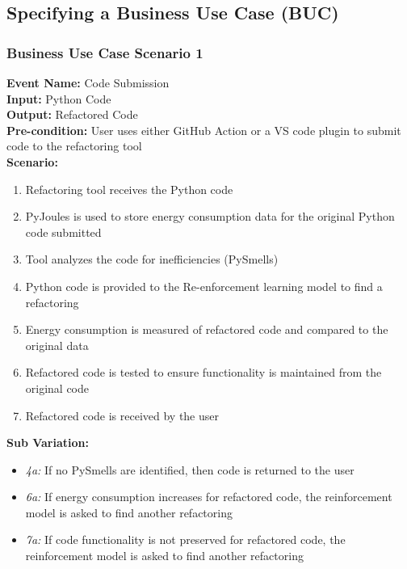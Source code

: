 \documentclass[12pt]{article}
\begin{document}
\subsection{Specifying a Business Use Case (BUC)}

\subsubsection{Business Use Case Scenario 1}
\textbf{Event Name:} Code Submission \\
\textbf{Input:} Python Code \\
\textbf{Output:} Refactored Code \\
\textbf{Pre-condition:} User uses either GitHub Action or a VS code plugin to submit code to the refactoring tool \\  
\textbf{Scenario:}
    \begin{enumerate}
        \item Refactoring tool receives the Python code
        \item PyJoules is used to store energy consumption data for the original Python code submitted
        \item Tool analyzes the code for inefficiencies (PySmells)
        \item Python code is provided to the Re-enforcement learning model to find a refactoring
        \item Energy consumption is measured of refactored code and compared to the original data
        \item Refactored code is tested to ensure functionality is maintained from the original code
        \item Refactored code is received by the user
    \end{enumerate}
\textbf{Sub Variation: }
    \begin{itemize}
        \item \textit{4a:} If no PySmells are identified, then code is returned to the user
        \item \textit{6a:} If energy consumption increases for refactored code, the reinforcement model is asked to find another refactoring
        \item \textit{7a:} If code functionality is not preserved for refactored code, the reinforcement model is asked to find another refactoring
    \end{itemize}
\end{document}
